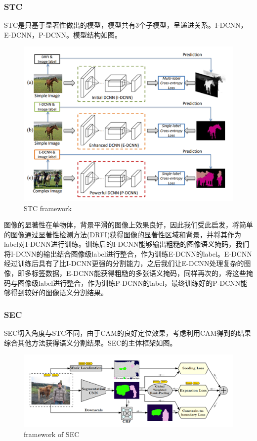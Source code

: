 \documentclass{article}
\begin{document}
\begin{CJK}{UTF8}{gbsn}
\subsubsection{STC}
STC\cite{wei2017stc}是只基于显著性做出的模型，模型共有3个子模型，呈递进关系。I-DCNN，E-DCNN，P-DCNN。模型结构如图\cite{STC}。
\begin{figure}[h]
    \centering
    \includegraphics[scale=0.6]{imgs/2-7_(STC)_framework.png}
    \caption{STC framework}
    \label{STC}
\end{figure}

图像的显著性在单物体，背景平滑的图像上效果良好，因此我们受此启发，将简单的图像通过显著性检测方法(DRFI\cite{jiang2013salient})获得图像的显著性区域和背景，并将其作为label对I-DCNN进行训练。训练后的I-DCNN能够输出粗糙的图像语义掩码，我们将I-DCNN的输出结合图像级label进行整合，作为训练E-DCNN的label。E-DCNN经过训练后具有了比I-DCNN更强的分割能力，之后我们让E-DCNN处理复杂的图像，即多标签数据，E-DCNN能获得粗糙的多张语义掩码，同样再次的，将这些掩码与图像级label进行整合，作为训练P-DCNN的label，最终训练好的P-DCNN能够得到较好的图像语义分割结果。

\subsubsection{SEC}
SEC\cite{kolesnikov2016seed}切入角度与STC\cite{wei2017stc}不同，由于CAM\cite{zhou2016learning}的良好定位效果，考虑利用CAM\cite{zhou2016learning}得到的结果综合其他方法获得语义分割结果。SEC\cite{kolesnikov2016seed}的主体框架如图\cite{SEC}。
\begin{figure}[h]
    \centering
    \includegraphics[scale=0.7]{imgs/2-8_framework_of_SEC.png}
    \caption{framework of SEC}
    \label{SEC}
\end{figure}


\end{CJK}
\end{document}
